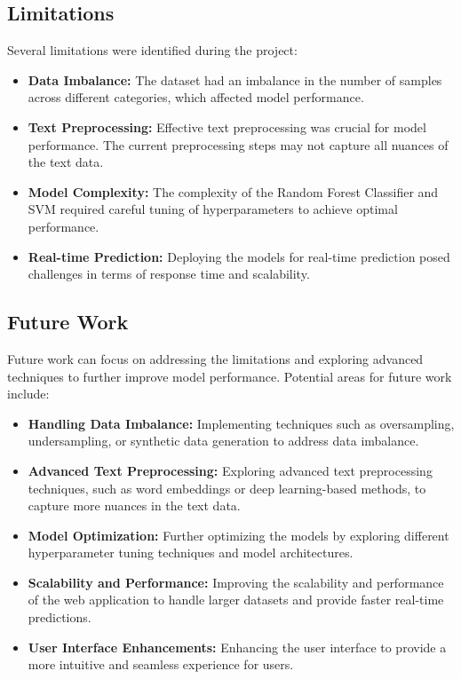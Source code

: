 \documentclass[10pt]{article}
\begin{document}
\subsection{Limitations}
Several limitations were identified during the project:
\begin{itemize}
    \item \textbf{Data Imbalance:} The dataset had an imbalance in the number of samples across different categories, which affected model performance.
    \item \textbf{Text Preprocessing:} Effective text preprocessing was crucial for model performance. The current preprocessing steps may not capture all nuances of the text data.
    \item \textbf{Model Complexity:} The complexity of the Random Forest Classifier and SVM required careful tuning of hyperparameters to achieve optimal performance.
    \item \textbf{Real-time Prediction:} Deploying the models for real-time prediction posed challenges in terms of response time and scalability.
\end{itemize}

\subsection{Future Work}
Future work can focus on addressing the limitations and exploring advanced techniques to further improve model performance. Potential areas for future work include:
\begin{itemize}
    \item \textbf{Handling Data Imbalance:} Implementing techniques such as oversampling, undersampling, or synthetic data generation to address data imbalance.
    \item \textbf{Advanced Text Preprocessing:} Exploring advanced text preprocessing techniques, such as word embeddings or deep learning-based methods, to capture more nuances in the text data.
    \item \textbf{Model Optimization:} Further optimizing the models by exploring different hyperparameter tuning techniques and model architectures.
    \item \textbf{Scalability and Performance:} Improving the scalability and performance of the web application to handle larger datasets and provide faster real-time predictions.
    \item \textbf{User Interface Enhancements:} Enhancing the user interface to provide a more intuitive and seamless experience for users.
\end{itemize}
\end{document}
